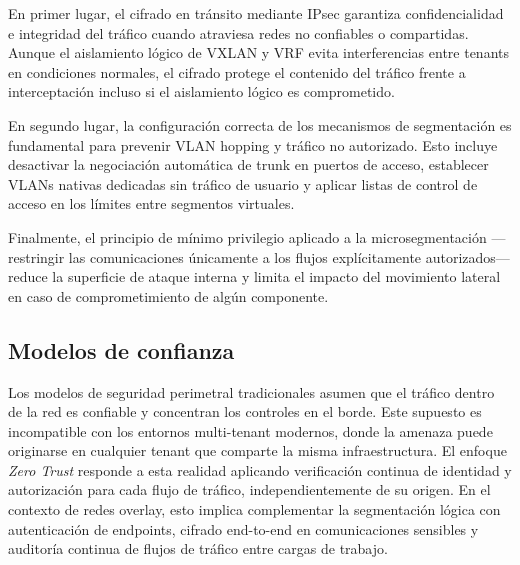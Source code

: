 En primer lugar, el cifrado en tránsito mediante IPsec garantiza confidencialidad e integridad del tráfico cuando atraviesa redes no confiables o compartidas. Aunque el aislamiento lógico de VXLAN y VRF evita interferencias entre tenants en condiciones normales, el cifrado protege el contenido del tráfico frente a interceptación incluso si el aislamiento lógico es comprometido.

En segundo lugar, la configuración correcta de los mecanismos de segmentación es fundamental para prevenir VLAN hopping y tráfico no autorizado. Esto incluye desactivar la negociación automática de trunk en puertos de acceso, establecer VLANs nativas dedicadas sin tráfico de usuario y aplicar listas de control de acceso en los límites entre segmentos virtuales.

Finalmente, el principio de mínimo privilegio aplicado a la microsegmentación —restringir las comunicaciones únicamente a los flujos explícitamente autorizados— reduce la superficie de ataque interna y limita el impacto del movimiento lateral en caso de comprometimiento de algún componente.

\subsection{Modelos de confianza}

Los modelos de seguridad perimetral tradicionales asumen que el tráfico dentro de la red es confiable y concentran los controles en el borde. Este supuesto es incompatible con los entornos multi-tenant modernos, donde la amenaza puede originarse en cualquier tenant que comparte la misma infraestructura. El enfoque \textit{Zero Trust} responde a esta realidad aplicando verificación continua de identidad y autorización para cada flujo de tráfico, independientemente de su origen. En el contexto de redes overlay, esto implica complementar la segmentación lógica con autenticación de endpoints, cifrado end-to-end en comunicaciones sensibles y auditoría continua de flujos de tráfico entre cargas de trabajo.
